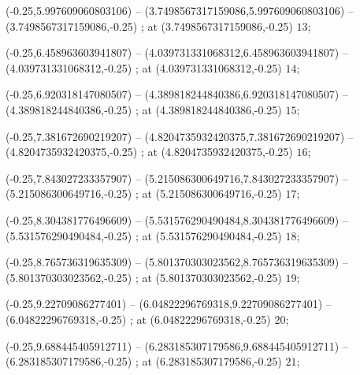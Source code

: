 (-0.25,5.997609060803106) --
(3.7498567317159086,5.997609060803106) --
(3.7498567317159086,-0.25)
;
 at (3.7498567317159086,-0.25) {\tiny{$13$}};

(-0.25,6.458963603941807) --
(4.039731331068312,6.458963603941807) --
(4.039731331068312,-0.25)
;
 at (4.039731331068312,-0.25) {\tiny{$14$}};

(-0.25,6.920318147080507) --
(4.389818244840386,6.920318147080507) --
(4.389818244840386,-0.25)
;
 at (4.389818244840386,-0.25) {\tiny{$15$}};

(-0.25,7.381672690219207) --
(4.8204735932420375,7.381672690219207) --
(4.8204735932420375,-0.25)
;
 at (4.8204735932420375,-0.25) {\tiny{$16$}};

(-0.25,7.843027233357907) --
(5.215086300649716,7.843027233357907) --
(5.215086300649716,-0.25)
;
 at (5.215086300649716,-0.25) {\tiny{$17$}};

(-0.25,8.304381776496609) --
(5.531576290490484,8.304381776496609) --
(5.531576290490484,-0.25)
;
 at (5.531576290490484,-0.25) {\tiny{$18$}};

(-0.25,8.765736319635309) --
(5.801370303023562,8.765736319635309) --
(5.801370303023562,-0.25)
;
 at (5.801370303023562,-0.25) {\tiny{$19$}};

(-0.25,9.22709086277401) --
(6.04822296769318,9.22709086277401) --
(6.04822296769318,-0.25)
;
 at (6.04822296769318,-0.25) {\tiny{$20$}};

(-0.25,9.688445405912711) --
(6.283185307179586,9.688445405912711) --
(6.283185307179586,-0.25)
;
 at (6.283185307179586,-0.25) {\tiny{$21$}};

